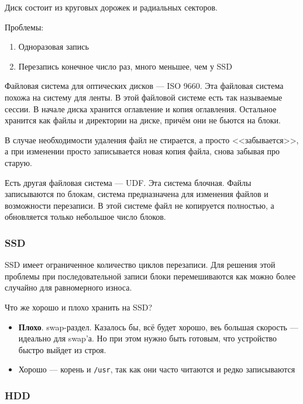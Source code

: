 Диск состоит из круговых дорожек и радиальных секторов.

Проблемы:

\begin{enumerate}
\item Одноразовая запись
\item Перезапись конечное число раз, много меньшее, чем у SSD
\end{enumerate}

Файловая система для оптических дисков --- ISO 9660. Эта файловая система похожа на систему для ленты. В этой файловой системе есть так называемые сессии. В начале диска хранится оглавление и копия оглавления. Остальное хранится как файлы и директории на диске, причём они не бьются на блоки. 

В случае необходимости удаления файл не стирается, а просто <<забывается>>, а при изменении просто записывается новая копия файла, снова забывая про старую.

Есть другая файловая система --- UDF. Эта система блочная. Файлы записываются по блокам, система предназначена для изменения файлов и возможности перезаписи. В этой системе файл не копируется полностью, а обновляется только небольшое число блоков.

\subsubsection{SSD}

SSD имеет ограниченное количество циклов перезаписи. Для решения этой проблемы при последовательной записи блоки перемешиваются как можно более случайно для равномерного износа.

Что же хорошо и плохо хранить на SSD? 

\begin{itemize}
\item  \textbf{Плохо}. swap-раздел. Казалось бы, всё будет хорошо, веь большая скорость --- идеально для swap'а. Но при этом нужно быть готовым, что устройство быстро выйдет из строя.

\item Хорошо --- корень и \verb!/usr!, так как они часто читаются и редко записываются

\end{itemize}

\subsubsection{HDD}

